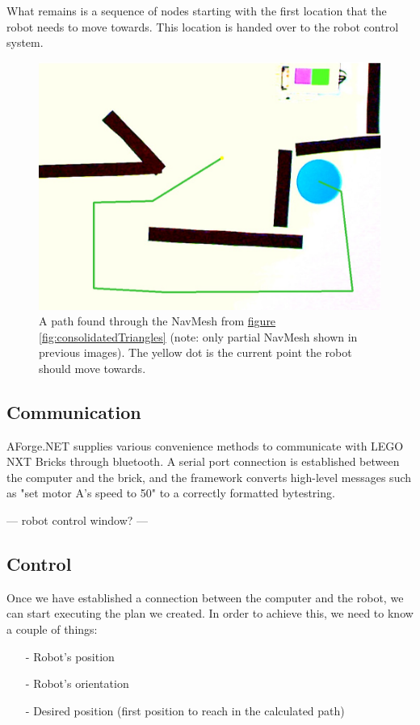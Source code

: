 \documentclass[10pt,twocolumn]{scrartcl}
\newcommand{\fref}[1]{\hyperref[#1]{figure \vref{#1}}}
\begin{document}
What remains is a sequence of nodes starting with the first location that the robot needs to move towards. This location is handed over to the robot control system.

\begin{figure}
	\centering
	\includegraphics[width=\columnwidth]{pictures/computedPath.png}
	\caption{A path found through the NavMesh from \fref{fig:consolidatedTriangles} (note: only partial NavMesh shown in previous images). The yellow dot is the current point the robot should move towards.}
	\label{fig:computedPath}
\end{figure}

\subsection{Communication}
AForge.NET supplies various convenience methods to communicate with LEGO NXT Bricks through bluetooth. A serial port connection is established between the computer and the brick, and the framework converts high-level messages such as "set motor A's speed to 50" to a correctly formatted bytestring.

--- robot control window? ---

\subsection{Control}
Once we have established a connection between the computer and the robot, we can start executing the plan we created. In order to achieve this, we need to know a couple of things:

\begin{itemize}
	\item[-] Robot's position
	\item[-] Robot's orientation
	\item[-] Desired position (first position to reach in the calculated path)
\end{itemize}
\end{document}
